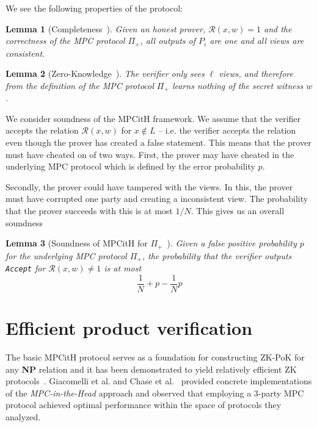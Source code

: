\documentclass[11pt]{report}
\theoremstyle{definition}
\theoremstyle{plain}
\newtheorem{lemma}{Lemma}[section]
\begin{document}
\noindent We see the following properties of the protocol:

\begin{lemma}[Completeness~\cite{ishai2007zero}]\label{def:mpcinth_completeness}
  Given an honest prover, $\mathcal{R}(x,w) = 1$ and the correctness of the MPC protocol $\Pi_+$, all outputs of $P_i$ are one and all views are consistent.
\end{lemma}

\begin{lemma}[Zero-Knowledge~\cite{ishai2007zero}]
  The verifier only sees $\ell$ views, and therefore from the definition of the MPC protocol $\Pi_+$ learns nothing of the secret witness $w$.
\end{lemma}

We consider soundness of the MPCitH framework. We assume that the verifier accepts the relation $\mathcal{R}(x,w)$ for $x \notin L$ -- i.e. the verifier accepts the relation even though the prover has created a false statement. This means that the prover must have cheated on of two ways. First, the prover may have cheated in the underlying MPC protocol which is defined by the error probability $p$.

Secondly, the prover could have tampered with the views. In this, the prover must have corrupted one party and creating a inconsistent view. The probability that the prover succeeds with this is at most $1 / N$. This gives us an overall soundness

\begin{lemma}[Soundness of MPCitH for $\Pi_+$~\cite{feneuil2022syndrome}]\label{lem:soundness_mpcinth} Given a false positive probability $p$ for the underlying MPC protocol $\Pi_+$, the probability that the verifier outputs \texttt{Accept} for $\mathcal{R}(x,w) \neq 1$ is at most \[ \frac{1}{N} + p - \frac{1}{N} p \]
\end{lemma}


\section{Efficient product verification}\label{sec:mpc_sacrificing}

The basic MPCitH protocol serves as a foundation for constructing ZK-PoK for any \textbf{NP} relation and it has been demonstrated to yield relatively efficient ZK protocols~\cite{feneuil2022syndrome,baum2020concretely,katz2018improved}. Giacomelli et al. and Chase et al.~\cite{katz2018improved,giacomelli2016zkboo,chase2017post} provided concrete implementations of the \textit{MPC-in-the-Head} approach and observed that employing a 3-party MPC protocol achieved optimal performance within the space of protocols they analyzed. 
\end{document}
